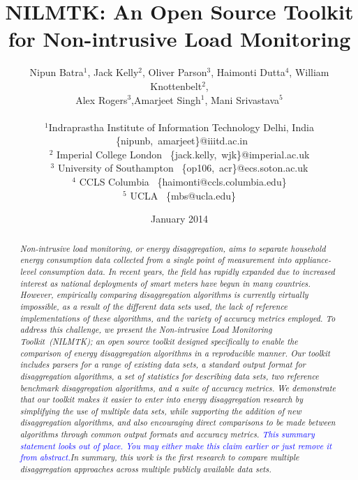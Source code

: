 \documentclass{sig-alternate}
\title{NILMTK: An Open Source Toolkit for Non-intrusive Load Monitoring}
\author{Nipun Batra$^1$, Jack Kelly$^2$, Oliver Parson$^3$, Haimonti Dutta$^4$, William Knottenbelt$^2$,\\ Alex Rogers$^3$,Amarjeet Singh$^1$, Mani Srivastava$^5$\\ \\
\small$^1$Indraprastha Institute of Information Technology Delhi, India ~\{nipunb,~amarjeet\}@iiitd.ac.in\\
\small$^2$ Imperial College London ~\{jack.kelly,~wjk\}@imperial.ac.uk\\
\small$^3$ University of Southampton ~\{op106,~acr\}@ecs.soton.ac.uk\\
\small$^4$ CCLS Columbia ~\{haimonti@ccls.columbia.edu\}\\
\small$^5$ UCLA ~\{mbs@ucla.edu\}\\
}
\date{January 2014}
\newcommand{\bluecolor}[1]{\textcolor{blue}{#1}}
\newcommand\Mark[1]{\textsuperscript#1}
\begin{document}
\maketitle



\begin{abstract}

\noindent
\textit{
Non-intrusive load monitoring, or energy disaggregation, aims to separate household energy consumption data collected from a single point of measurement into appliance-level consumption data. In recent years, the field has rapidly expanded due to increased interest as national deployments of smart meters have begun in many countries. However, empirically comparing disaggregation algorithms is currently virtually impossible, as a result of the different data sets used, the lack of reference implementations of these algorithms, and the variety of accuracy metrics employed. To address this challenge, we present the Non-intrusive Load Monitoring Toolkit~(NILMTK); an open source toolkit designed specifically to enable the comparison of energy disaggregation algorithms in a reproducible manner. Our toolkit includes parsers for a range of existing data sets, a standard output format for disaggregation algorithms, a set of statistics for describing data sets, two reference benchmark disaggregation algorithms, and a suite of accuracy metrics. We demonstrate that our toolkit makes it easier to enter into energy disaggregation research by simplifying the use of multiple data sets, while supporting the addition of new disaggregation algorithms, and also encouraging direct comparisons to be made between algorithms through common output formats and accuracy metrics. \bluecolor{This summary statement looks out of place. You may either make this claim earlier or just remove it from abstract.}In summary, this work is the first research to compare multiple disaggregation approaches across multiple publicly available data sets.}
\end{abstract}
\end{document}

